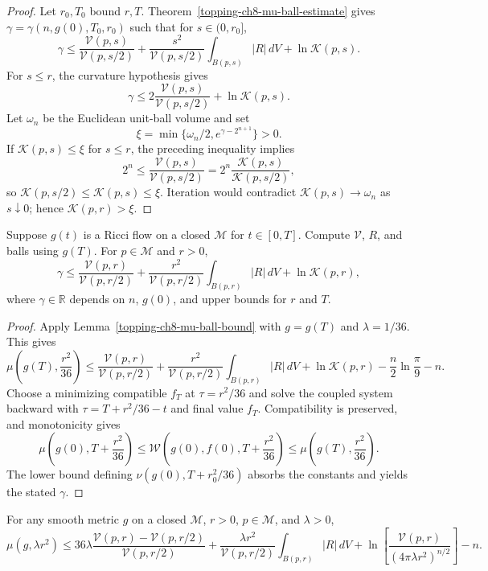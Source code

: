 \begin{proof}
\sketch Let $r_0,T_0$ bound $r,T$. Theorem~\ref{topping-ch8-mu-ball-estimate} gives
$\gamma=\gamma(n,g(0),T_0,r_0)$ such that for $s\in(0,r_0]$,
\[
\gamma\leq\frac{\mathcal V(p,s)}{\mathcal V(p,s/2)}
+\frac{s^2}{\mathcal V(p,s/2)}\int_{B(p,s)}|R|\,dV+\ln\mathcal K(p,s).
\]
For $s\leq r$, the curvature hypothesis gives
\[
\gamma\leq2\frac{\mathcal V(p,s)}{\mathcal V(p,s/2)}+\ln\mathcal K(p,s).
\]
Let $\omega_n$ be the Euclidean unit-ball volume and set
\[
\xi=\min\{\omega_n/2,e^{\gamma-2^{n+1}}\}>0.
\]
If $\mathcal K(p,s)\leq\xi$ for $s\leq r$, the preceding inequality implies
\[
2^n\leq\frac{\mathcal V(p,s)}{\mathcal V(p,s/2)}
=2^n\frac{\mathcal K(p,s)}{\mathcal K(p,s/2)},
\]
so $\mathcal K(p,s/2)\leq\mathcal K(p,s)\leq\xi$. Iteration would contradict
$\mathcal K(p,s)\to\omega_n$ as $s\downarrow0$; hence
$\mathcal K(p,r)>\xi$.
\end{proof}

\begin{theorem}
\label{topping-ch8-mu-ball-estimate}
Suppose $g(t)$ is a Ricci flow on a closed $\mathcal M$ for $t\in[0,T]$.
Compute $\mathcal V$, $R$, and balls using $g(T)$. For $p\in\mathcal M$ and
$r>0$,
\[
\gamma\leq\frac{\mathcal V(p,r)}{\mathcal V(p,r/2)}
+\frac{r^2}{\mathcal V(p,r/2)}\int_{B(p,r)}|R|\,dV
+\ln\mathcal K(p,r),
\]
where $\gamma\in\mathbb R$ depends on $n$, $g(0)$, and upper bounds for $r$
and $T$.
\end{theorem}

\begin{proof}
\sketch Apply Lemma~\ref{topping-ch8-mu-ball-bound} with $g=g(T)$ and $\lambda=1/36$. This gives
\[
\mu\left(g(T),\frac{r^2}{36}\right)
\leq\frac{\mathcal V(p,r)}{\mathcal V(p,r/2)}
+\frac{r^2}{\mathcal V(p,r/2)}\int_{B(p,r)}|R|\,dV
+\ln\mathcal K(p,r)-\frac n2\ln\frac\pi9-n.
\]
Choose a minimizing compatible $f_T$ at $\tau=r^2/36$ and solve the coupled
system backward with $\tau=T+r^2/36-t$ and final value $f_T$. Compatibility is
preserved, and monotonicity gives
\[
\mu\left(g(0),T+\frac{r^2}{36}\right)
\leq\mathcal W\left(g(0),f(0),T+\frac{r^2}{36}\right)
\leq\mu\left(g(T),\frac{r^2}{36}\right).
\]
The lower bound defining $\nu(g(0),T+r_0^2/36)$ absorbs the constants and
yields the stated $\gamma$.
\end{proof}

\begin{lemma}
\label{topping-ch8-mu-ball-bound}
For any smooth metric $g$ on a closed $\mathcal M$, $r>0$, $p\in\mathcal M$,
and $\lambda>0$,
\[
\mu(g,\lambda r^2)\leq36\lambda
\frac{\mathcal V(p,r)-\mathcal V(p,r/2)}{\mathcal V(p,r/2)}
+\frac{\lambda r^2}{\mathcal V(p,r/2)}\int_{B(p,r)}|R|\,dV
+\ln\left[\frac{\mathcal V(p,r)}{(4\pi\lambda r^2)^{n/2}}\right]-n.
\]
\end{lemma}

